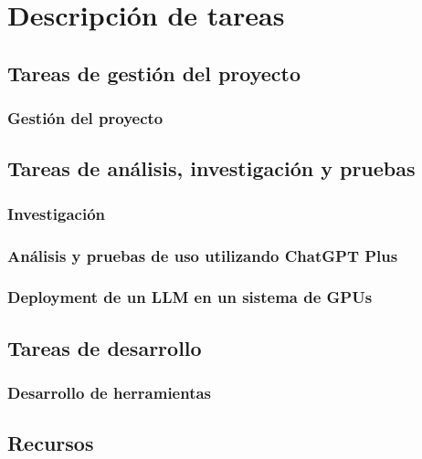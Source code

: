 \chapter{Descripción de tareas}
\label{cap:tareas}

\section{Tareas de gestión del proyecto}
\label{sec:tareas_gestion}

\subsection{Gestión del proyecto}
\label{subsec:tareas_gestion}

\section{Tareas de análisis, investigación y pruebas}
\label{sec:tareas_analisis}

\subsection{Investigación}
\label{subsec:tareas_investigacion}

\subsection{Análisis y pruebas de uso utilizando ChatGPT Plus}
\label{subsec:tareas_ichatgpt}

\subsection{Deployment de un LLM en un sistema de GPUs}
\label{subsec:tareas_gpu}

\section{Tareas de desarrollo}
\label{sec:tareas_desarrollo}

\subsection{Desarrollo de herramientas}
\label{subsec:tareas_herramientas}

\section{Recursos}
\label{sec:recursos}
